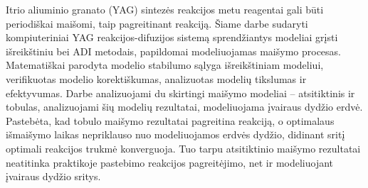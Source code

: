 
Itrio aliuminio granato (YAG) sintezės reakcijos metu reagentai gali būti periodiškai maišomi, taip pagreitinant reakciją. Šiame darbe sudaryti kompiuteriniai YAG reakcijos-difuzijos sistemą sprendžiantys modeliai grįsti išreikštiniu bei ADI metodais, papildomai modeliuojamas maišymo procesas. Matematiškai parodyta modelio stabilumo sąlyga išreikštiniam modeliui, verifikuotas modelio korektiškumas, analizuotas modelių tikslumas ir efektyvumas. Darbe analizuojami du skirtingi maišymo modeliai -- atsitiktinis ir tobulas, analizuojami šių modelių rezultatai, modeliuojama įvairaus dydžio erdvė. Pastebėta, kad tobulo maišymo rezultatai pagreitina reakciją, o optimalaus išmaišymo laikas nepriklauso nuo modeliuojamos erdvės dydžio, didinant sritį optimali reakcijos trukmė konverguoja. Tuo tarpu atsitiktinio maišymo rezultatai neatitinka praktikoje pastebimo reakcijos pagreitėjimo, net ir modeliuojant įvairaus dydžio sritys.

\newpage 


\newpage 